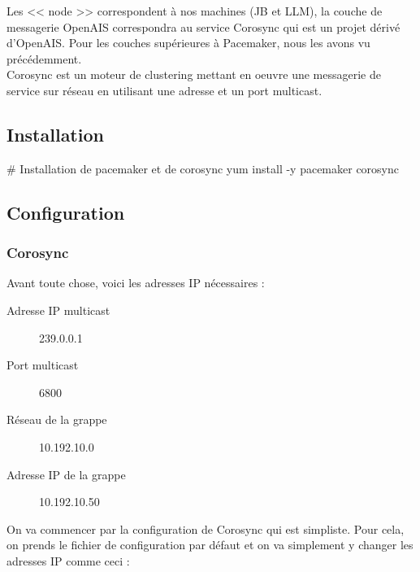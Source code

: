 \documentclass[11pt,a4paper]{report}
\begin{document}
                Les << node >> correspondent à nos machines (JB et LLM), la couche de messagerie OpenAIS correspondra au service Corosync qui est un projet dérivé d'OpenAIS. Pour les couches supérieures à Pacemaker, nous les avons vu précédemment.\\
                
                Corosync est un moteur de clustering mettant en oeuvre une messagerie de service sur réseau en utilisant une adresse et un port multicast.
            
            \subsection{Installation}
            
                \begin{bashcode}
                    # Installation de pacemaker et de corosync
                    yum install -y pacemaker corosync
                \end{bashcode}
            
            \subsection{Configuration}
                
                \subsubsection{Corosync}
                
                    Avant toute chose, voici les adresses IP nécessaires :\\

                    \begin{description}
                        \item[Adresse IP multicast] 239.0.0.1
                        \item[Port multicast] 6800
                        \item[Réseau de la grappe] 10.192.10.0
                        \item[Adresse IP de la grappe] 10.192.10.50
                    \end{description}

                    On va commencer par la configuration de Corosync qui est simpliste. Pour cela, on prends le fichier de configuration par défaut et on va simplement y changer les adresses IP comme ceci :\\
\end{document}
